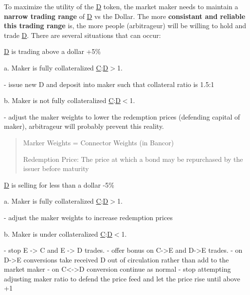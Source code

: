 To maximize the utility of the \mbox{\hyperlink{struct_d}{D}} token, the market maker needs to maintain a {\bfseries narrow trading range} of \mbox{\hyperlink{struct_d}{D}} vs the Dollar. The more {\bfseries consistant and reliable this trading range} is, the more people (arbitrageur) will be willing to hold and trade \mbox{\hyperlink{struct_d}{D}}. There are several situations that can occur\+:


\begin{DoxyEnumerate}
\item \mbox{\hyperlink{struct_d}{D}} is trading above a dollar +5\%

a. Maker is fully collateralized {\ttfamily \mbox{\hyperlink{struct_c}{C}}\+:\mbox{\hyperlink{struct_d}{D}}$>$1.} \begin{DoxyVerb}- issue new D and deposit into maker such that collateral ratio is 1.5:1
\end{DoxyVerb}
 b. Maker is not fully collateralized {\ttfamily \mbox{\hyperlink{struct_c}{C}}\+:\mbox{\hyperlink{struct_d}{D}}$<$1.} \begin{DoxyVerb}- adjust the maker weights to lower the redemption prices (defending capital of maker), arbitrageur will probably prevent this reality.
\end{DoxyVerb}

\end{DoxyEnumerate}

\begin{quote}
Marker Weights = Connector Weights (in Bancor)

Redemption Price\+: The price at which a bond may be repurchased by the issuer before maturity \end{quote}



\begin{DoxyEnumerate}
\item \mbox{\hyperlink{struct_d}{D}} is selling for less than a dollar -\/5\%

a. Maker is fully collateralized {\ttfamily \mbox{\hyperlink{struct_c}{C}}\+:\mbox{\hyperlink{struct_d}{D}}$>$1.} \begin{DoxyVerb}- adjust the maker weights to increase redemption prices 
\end{DoxyVerb}
 b. Maker is under collateralized {\ttfamily \mbox{\hyperlink{struct_c}{C}}\+:\mbox{\hyperlink{struct_d}{D}}$<$1.} 
\begin{DoxyCode}
- stop E -> C and E -> D trades.
- offer bonus on C->E and D->E trades.
- on D->E conversions take received D out of circulation rather than add to the market maker
- on C<->D conversion continue as normal
- stop attempting adjusting maker ratio to defend the price feed and let the price rise until above +1%
\end{DoxyCode}

\end{DoxyEnumerate}

